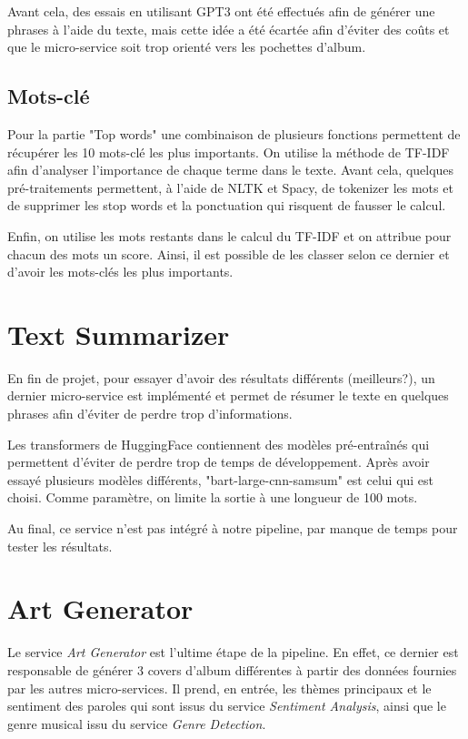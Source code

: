 Avant cela, des essais en utilisant GPT3 ont été effectués afin de générer une phrases à l'aide du texte, mais cette idée a été écartée afin d'éviter des coûts et que le micro-service soit trop orienté vers les pochettes d'album.

\subsection{Mots-clé}
Pour la partie "Top words" une combinaison de plusieurs fonctions permettent de récupérer les 10 mots-clé les plus importants. On utilise la méthode de TF-IDF afin d'analyser l'importance de chaque terme dans le texte. Avant cela, quelques pré-traitements permettent, à l'aide de NLTK et Spacy, de tokenizer les mots et de supprimer les stop words et la ponctuation qui risquent de fausser le calcul.

Enfin, on utilise les mots restants dans le calcul du TF-IDF et on attribue pour chacun des mots un score. Ainsi, il est possible de les classer selon ce dernier et d'avoir les mots-clés les plus importants.

\section{Text Summarizer}
En fin de projet, pour essayer d'avoir des résultats différents (meilleurs?), un dernier micro-service est implémenté et permet de résumer le texte en quelques phrases afin d'éviter de perdre trop d'informations.

Les transformers de HuggingFace contiennent des modèles pré-entraînés qui permettent d'éviter de perdre trop de temps de développement. Après avoir essayé plusieurs modèles différents, "bart-large-cnn-samsum" est celui qui est choisi. Comme paramètre, on limite la sortie à une longueur de 100 mots.

Au final, ce service n'est pas intégré à notre pipeline, par manque de temps pour tester les résultats.

\clearpage

\section{Art Generator}
Le service \textit{Art Generator} est l'ultime étape de la pipeline. En effet, ce dernier est responsable de générer 3 covers d'album différentes à partir des données fournies par les autres micro-services. 
Il prend, en entrée, les thèmes principaux et le sentiment des paroles qui sont issus du service \textit{Sentiment Analysis}, 
ainsi que le genre musical issu du service \textit{Genre Detection}. 

